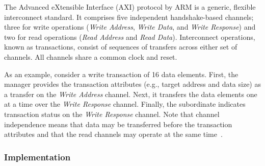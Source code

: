 \documentclass[conference]{IEEEtran}
\begin{document}
The Advanced eXtensible Interface (AXI) protocol by ARM is a generic, flexible interconnect standard. It comprises five independent handshake-based channels; three for write operations (\textit{Write Address}, \textit{Write Data}, and \textit{Write Response}) and two for read operations (\textit{Read Address} and \textit{Read Data}). Interconnect operations, known as transactions, consist of sequences of transfers across either set of channels. All channels share a common clock and reset.


As an example, consider a write transaction of 16 data elements. First, the manager provides the transaction attributes (e.g., target address and data size) as a transfer on the \textit{Write Address} channel. Next, it transfers the data elements one at a time over the \textit{Write Response} channel. Finally, the subordinate indicates transaction status on the \textit{Write Response} channel. Note that channel independence means that data may be transferred before the transaction attributes and that the read channels may operate at the same time~\cite{axi4standard}.

\subsubsection{Implementation}
\end{document}
